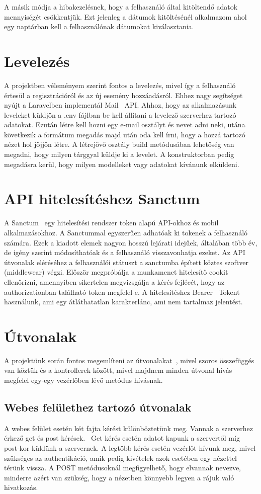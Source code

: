\documentclass[
]{thesis-ekf}
\theoremstyle{definition}
\theoremstyle{remark}
\begin{document}
	A másik módja a hibakezelésnek, hogy a felhasználó által kitöltendő adatok mennyiségét csökkentjük. Ezt jelenleg a dátumok kitöltésénél alkalmazom ahol egy naptárban kell a felhasználónak dátumokat kiválasztania. 
	
	\section{Levelezés}
	A projektben véleményem szerint fontos a levelezés, mivel így a felhasználó értesül a regisztrációról és az új esemény hozzáadásról. Ehhez nagy segítséget nyújt a Laravelben implementál Mail~\cite{laravel_mail} API. Ahhoz, hogy az alkalmazásunk leveleket küldjön a .env fájlban be kell állítani a levelező szerverhez tartozó adatokat. Ezután létre kell hozni egy e-mail osztályt és nevet adni neki, utána következik a formátum megadás majd után oda kell írni, hogy a hozzá tartozó nézet hol jöjjön létre. A létrejövő osztály build metódusában lehetőség van megadni, hogy milyen tárggyal küldje ki a levelet. A konstruktorban pedig megadásra kerül, hogy milyen modelleket vagy adatokat kívánunk elküldeni.
	
	\section{API hitelesítéshez Sanctum}
	A Sanctum~\cite{laravel_sanctum} egy hitelesítési rendszer token alapú API-okhoz és mobil alkalmazásokhoz. A Sanctummal egyszerűen adhatóak ki tokenek a felhasználó számára. Ezek a kiadott elemek nagyon hosszú lejárati idejűek, általában több év, de igény szerint módosíthatóak és a felhasználó visszavonhatja ezeket. Az API útvonalak eléréséhez a felhasználói státuszt a sanctumba épített köztes szoftver (middlewear) végzi. Először megpróbálja a munkamenet hitelesítő cookit ellenőrizni, amennyiben sikertelen megvizsgálja a kérés fejlécét, hogy az authorizationban található token megfelel-e. A hitelesítéshez Bearer~\cite{bearer_token} Tokent használunk, ami egy átláthatatlan karakterlánc, ami nem tartalmaz jelentést.
	
	\section{Útvonalak}
	A projektünk során fontos megemlíteni az útvonalakat~\cite{laravel_route}, mivel szoros összefüggés van köztük és a kontrollerek között, mivel majdnem minden útvonal hívás megfelel egy-egy vezérlőben lévő metódus hívásnak. 
	
	\subsection{Webes felülethez tartozó útvonalak}
	A webes felület esetén két fajta kérést különböztetünk meg. Vannak a szerverhez érkező get és post kérések.~\cite{get_post_difference} Get kérés esetén adatot kapunk a szervertől míg post-kor küldünk a szervernek. A legtöbb kérés esetén vezérlőt hívunk meg, mivel szükséges az authentikáció, amik pedig kivételek azok esetében egy nézettel térünk vissza. A POST metódusoknál megfigyelhető, hogy elvannak nevezve, minderre azért van szükség, hogy a nézetben könnyebb legyen a rájuk való hivatkozás. 
	
\end{document}

